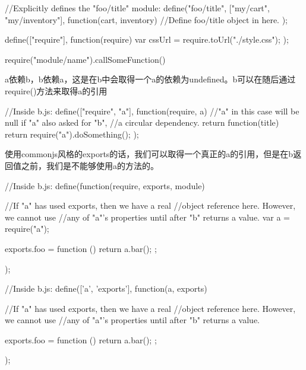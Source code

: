 \begin{JavaScript}
    //Explicitly defines the "foo/title" module:
    define("foo/title",
        ["my/cart", "my/inventory"],
        function(cart, inventory) {
            //Define foo/title object in here.
       }
    );
\end{JavaScript}

\begin{JavaScript}[取得Module对应的URL]
define(["require"], function(require) {
    var cssUrl = require.toUrl("./style.css");
});
\end{JavaScript}

\begin{JavaScript}[控制台取得Module]
require("module/name").callSomeFunction()
\end{JavaScript}

a依赖b，b依赖a，这是在b中会取得一个a的依赖为undefined。b可以在随后通过require()方法来取得a的引用
\begin{JavaScript}[循环依赖时]
//Inside b.js:
define(["require", "a"],
    function(require, a) {
        //"a" in this case will be null if "a" also asked for "b",
        //a circular dependency.
        return function(title) {
            return require("a").doSomething();
        }
    }
);
\end{JavaScript}

使用commonjs风格的exports的话，我们可以取得一个真正的a的引用，但是在b返回值之前，我们是不能够使用a的方法的。

\begin{JavaScript}
//Inside b.js:
define(function(require, exports, module) {
    //If "a" has used exports, then we have a real
    //object reference here. However, we cannot use
    //any of "a"'s properties until after "b" returns a value.
    var a = require("a");

    exports.foo = function () {
        return a.bar();
    };
});
\end{JavaScript}

\begin{JavaScript}
//Inside b.js:
define(['a', 'exports'], function(a, exports) {
    //If "a" has used exports, then we have a real
    //object reference here. However, we cannot use
    //any of "a"'s properties until after "b" returns a value.

    exports.foo = function () {
        return a.bar();
    };
});
\end{JavaScript}



